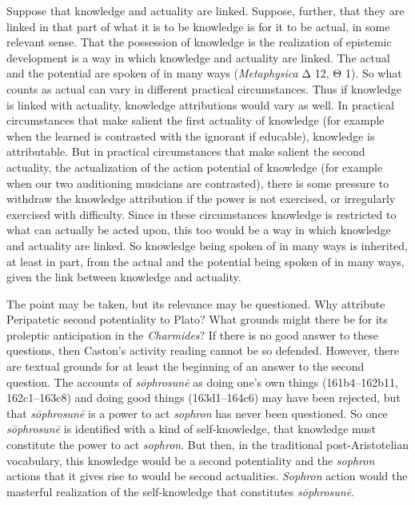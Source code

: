 Suppose that knowledge and actuality are linked. Suppose, further, that they are linked in that part of what it is to be knowledge is for it to be actual, in some relevant sense. That the possession of knowledge is the realization of epistemic development is a way in which knowledge and actuality are linked. The actual and the potential are spoken of in many ways (\emph{Metaphysica} {\sbl Δ} 12, {\sbl Θ} 1). So what counts as actual can vary in different practical circumstances. Thus if knowledge is linked with actuality, knowledge attributions would vary as well. In practical circumstances that make salient the first actuality of knowledge (for example when the learned is contrasted with the ignorant if educable), knowledge is attributable. But in practical circumstances that make salient the second actuality, the actualization of the action potential of knowledge (for example when our two auditioning musicians are contrasted), there is some pressure to withdraw the knowledge attribution if the power is not exercised, or irregularly exercised with difficulty. Since in these circumstances knowledge is restricted to what can actually be acted upon, this too would be a way in which knowledge and actuality are linked. So knowledge being spoken of in many ways is inherited, at least in part, from the actual and the potential being spoken of in many ways, given the link between knowledge and actuality.

The point may be taken, but its relevance may be questioned. Why attribute Peripatetic second potentiality to Plato? What grounds might there be for its proleptic anticipation in the \emph{Charmides}? If there is no good answer to these questions, then Caston's activity reading cannot be so defended. However, there are textual grounds for at least the beginning of an answer to the second question. The accounts of \emph{sōphrosunē} as doing one's own things (161b4–162b11, 162c1–163c8) and doing good things (163d1–164c6) may have been rejected, but that \emph{sōphrosunē} is a power to act \emph{sophron} has never been questioned. So once \emph{sōphrosunē} is identified with a kind of self-knowledge, that knowledge must constitute the power to act \emph{sophron}. But then, in the traditional post-Aristotelian vocabulary, this knowledge would be a second potentiality and the \emph{sophron} actions that it gives rise to would be second actualities. \emph{Sophron} action would the masterful realization of the self-knowledge that constitutes \emph{sōphrosunē}. 

